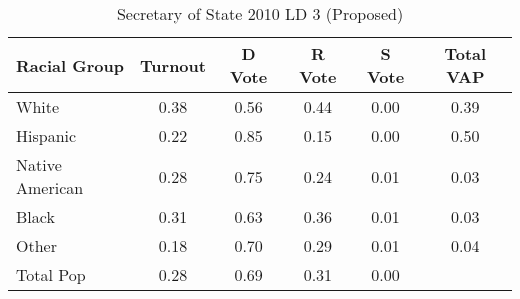 \begin{table}[htb]
\begin{center}
\caption{Secretary of State 2010 LD 3 (Proposed)}
\label{sos10_vap_ld_3}
\begin{tabular}{lccccc}
  \hline
Racial Group & Turnout & D Vote & R Vote & S Vote & Total VAP \\ 
  \hline
White & 0.38 & 0.56 & 0.44 & 0.00 & 0.39 \\ 
  Hispanic & 0.22 & 0.85 & 0.15 & 0.00 & 0.50 \\ 
  Native American & 0.28 & 0.75 & 0.24 & 0.01 & 0.03 \\ 
  Black & 0.31 & 0.63 & 0.36 & 0.01 & 0.03 \\ 
  Other & 0.18 & 0.70 & 0.29 & 0.01 & 0.04 \\ 
  Total Pop & 0.28 & 0.69 & 0.31 & 0.00 &  \\ 
   \hline
\end{tabular}
\end{center}
\end{table}
